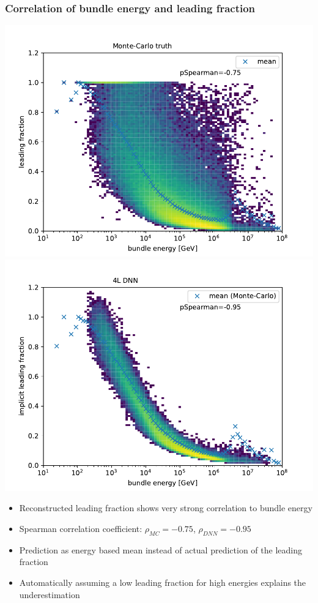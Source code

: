 \documentclass[aspectratio=1610, 9pt]{beamer}
\begin{document}
\begin{frame}
  \frametitle{Correlation of bundle energy and leading fraction}
  \includegraphics[scale=0.45]{Plots/correlation_MC_bundle_leading.pdf}
  \includegraphics[scale=0.45]{Plots/correlation_4L_bundle_leading_implicit.pdf}
  \begin{itemize}
    \item Reconstructed leading fraction shows very strong correlation to bundle energy
    \item Spearman correlation coefficient: $\rho_{MC}=\num{-0.75}$, $\rho_{DNN}=\num{-0.95}$
    \item Prediction as energy based mean instead of actual prediction of the leading fraction
    \item Automatically assuming a low leading fraction for high energies explains the underestimation
  \end{itemize}
\end{frame}
\end{document}
